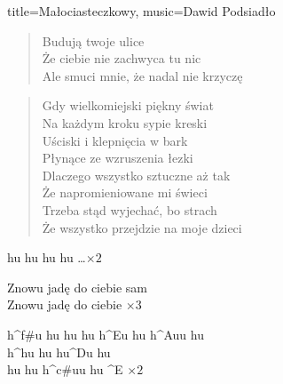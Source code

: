 \begin{song}{title={Małociasteczkowy}, music={Dawid Podsiadło}}
\begin{multicols}{2}
\begin{verse}
		Budują twoje ulice \\
		Że ciebie nie zachwyca tu nic \\
		Ale smuci mnie, że nadal nie krzyczę
	\end{verse}
	\begin{verse}
		Gdy wielkomiejski piękny świat \\
		Na każdym kroku sypie kreski \\
		Uściski i klepnięcia w bark \\
		Płynące ze wzruszenia łezki \\
		Dlaczego wszystko sztuczne aż tak \\ 
		Że napromieniowane mi świeci \\
		Trzeba stąd wyjechać, bo strach \\
		Że wszystko przejdzie na moje dzieci
	\end{verse}
	\begin{interlude}
		hu hu hu hu \ldots $\times 2$
	\end{interlude}
	\begin{chorus}
		Znowu jadę do ciebie sam \\
		Znowu jadę do ciebie $\times 3$ 		 
	\end{chorus}
	\begin{outro}
		h^{f#}u hu hu hu h^{E}u hu h^{A}uu hu \\
		h^{h}u hu hu^{D}u hu \\
		hu hu h^{c#}uu hu ^{E} $\times 2$
	\end{outro}
\end{multicols}
\end{song}

